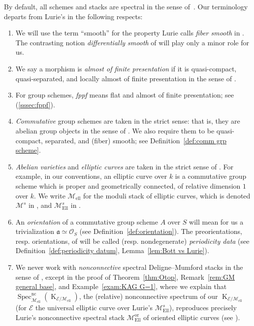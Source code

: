 \documentclass[12pt, oneside]{amsart}
\numberwithin{equation}{section}
\theoremstyle{remark}
\theoremstyle{plain}
\newcommand{\fra}{\mathfrak{a}}
\newcommand{\OO}{\mathcal{O}}
\newcommand{\Specnc}{\operatorname{Spec}^{\mathrm{nc}}}
\newcommand{\K}{\operatorname{K}}
\newcommand{\Mell}{\mathcal{M}_{\mathrm{ell}}}
\begin{document}
By default, all schemes and stacks are spectral in the sense of~\cite{SAG}.
Our terminology departs from Lurie's in the following respects:
\begin{enumerate}
	\item We will use the term ``smooth'' for the property Lurie calls \emph{fiber smooth} in \cite[Def.~11.2.5.5]{SAG}.
	The contrasting notion \emph{differentially smooth} of \cite[Def.~11.2.2.2]{SAG} will play only a minor role for us.

  \item We say a morphism is \emph{almost of finite presentation} if it is quasi-compact, quasi-separated, and locally almost of finite presentation in the sense of \cite[Def.~4.2.0.1]{SAG}.

  \item For group schemes, \emph{fppf} means flat and almost of finite presentation; see (\ref{sssec:fppf}).

  \item \emph{Commutative} group schemes are taken in the strict sense: that is, they are abelian group objects in the sense of \cite[Def.~1.2.4]{LurieEll1}.
  We also require them to be quasi-compact, separated, and (fiber) smooth; see Definition~\ref{def:comm grp scheme}.

  \item \emph{Abelian varieties} and \emph{elliptic curves} are taken in the strict sense of \cite[Defs.~1.5.1, 2.0.2]{LurieEll1}.
  For example, in our conventions, an elliptic curve over $k$ is a commutative group scheme which is proper and geometrically connected, of relative dimension $1$ over $k$.
  We write $\Mell$ for the moduli stack of elliptic curves, which is denoted $\mathcal{M}^{s}$ in \cite{LurieEll1}, and $\mathcal{M}_{\mathrm{Ell}}^{s}$ in \cite{LurieEll2}.

  \item An \emph{orientation} of a commutative group scheme $A$ over $S$ will mean for us a trivialization $\fra \simeq \OO_S$ (see Definition~\ref{def:orientation}).
  The preorientations, resp. orientations, of \cite{LurieEll2} will be called (resp. nondegenerate) \emph{periodicity data} (see Definition~\ref{def:periodicity datum}, Lemma~\ref{lem:Bott vs Lurie}).

  \item We never work with \emph{nonconnective} spectral Deligne--Mumford stacks in the sense of \cite[Def.~1.4.4.2]{SAG}, except in the proof of Theorem~\ref{thm:Otop}, Remark~\ref{rem:GM general base}, and Example~\ref{exam:KAG G=1}, where we explain that $\Specnc_{\Mell}(\K_{\mathcal{E}/\Mell})$, the (relative) nonconnective spectrum of our $\K_{\mathcal{E}/\Mell}$ (for $\mathcal{E}$ the universal elliptic curve over Lurie's $\mathcal{M}^{s}_{\mathrm{Ell}}$), reproduces precisely Lurie's nonconnective spectral stack $\mathcal{M}_{\mathrm{Ell}}^{\mathrm{or}}$ of oriented elliptic curves (see \cite[Prop.~7.2.10]{LurieEll2}).
\end{enumerate}
\end{document}
